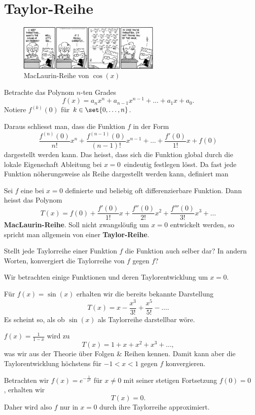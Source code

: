 \documentclass[%
11pt,%
twoside,%
titlepage,%
german,%
headsepline%
]{scrartcl}
\begin{document}
\section{Taylor-Reihe}
\begin{figure}
  \begin{center}
    \includegraphics[width=0.618\textwidth]{pictures/taylor}
  \end{center}
\caption{MacLaurin-Reihe von $\cos(x)$}
\end{figure}
\begin{ueb}
Betrachte das Polynom $n$-ten Grades
$$f(x)=a_nx^n+a_{n-1}x^{n-1}+\dots+a_1x+a_0.$$
Notiere $f^{(k)}(0)$ f\"ur $k\in\set{0,\dots,n}$.
\end{ueb}
\noindent Daraus schliesst man, dass die Funktion $f$ in der Form
$$\frac{f^{(n)}(0)}{n!}x^n+\frac{f^{(n-1)}(0)}{(n-1)!}x^{n-1}+\dots+\frac{f'(0)}{1!}x+f(0)$$
dargestellt werden kann. Das heisst, dass sich die Funktion global durch die lokale Eigenschaft \glqq Ableitung bei $x=0$\grqq\ eindeutig festlegen l\"osst.
Da fast jede Funktion n\"oherungsweise als Reihe dargestellt werden kann, definiert man

\begin{defn}
Sei $f$ eine bei $x=0$ definierte und beliebig oft differenzierbare Funktion. Dann heisst das Polynom
$$T(x)=f(0)+\frac{f'(0)}{1!}x+\frac{f''(0)}{2!}x^2+\frac{f'''(0)}{3!}x^3+\dots$$
\textbf{MacLaurin-Reihe}.
Soll
nicht zwangsl\"oufig um $x=0$ entwickelt werden, so spricht man allgemein von einer \textbf{Taylor-Reihe}.
\end{defn}

\begin{ueb}
Stellt jede Taylorreihe einer Funktion $f$ die Funktion auch selber dar? In andern Worten, konvergiert die Taylorreihe von $f$ gegen $f$?
\end{ueb}

\begin{bsp}
Wir betrachten einige Funktionen und deren Taylorentwicklung um $x=0$.
\begin{enumeratea}
\item F\"ur $f(x)=\sin(x)$ erhalten wir die bereits bekannte Darstellung
$$T(x)=x-\frac{x^3}{3!}+\frac{x^5}{5!}-\dots.$$
Es scheint so, als ob $\sin(x)$ als Taylorreihe darstellbar w\"ore.
\item $f(x)=\frac{1}{1-x}$ wird zu
$$T(x)=1+x+x^2+x^3+\dots,$$
was wir aus der Theorie \"uber Folgen \& Reihen kennen. Damit kann aber die Taylorentwicklung h\"ochstens f\"ur $-1<x<1$ gegen $f$ konvergieren.
\item Betrachten wir $f(x)=e^{-\frac{1}{x^2}}$ f\"ur $x\neq0$ mit seiner stetigen Fortsetzung $f(0)=0$, erhalten wir
$$T(x)=0.$$
Daher wird also $f$ nur in $x=0$ durch ihre Taylorreihe approximiert.
\end{enumeratea}
\end{bsp}
\end{document}
